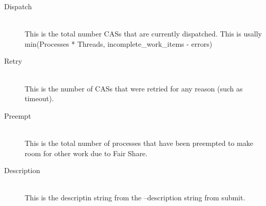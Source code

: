 \begin{description}
            \item[Dispatch] \hfill \\
              This is the total number CASs that are currently dispatched. This is usally
              min(Processes * Threads, incomplete\_work\_items - errors)
              
            \item[Retry] \hfill \\
              This is the number of CASs that were retried for any reason (such as timeout).
              
            \item[Preempt] \hfill \\
              This is the total number of processes that have been preempted to make room for
              other work due to Fair Share.
              
            \item[Description] \hfill \\
              This is the descriptin string from the --description string from submit.
            \end{description}
